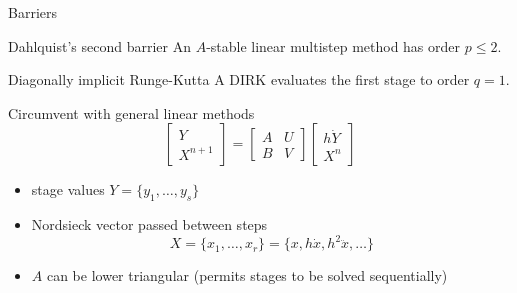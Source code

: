 \begin{frame}{Barriers}
  \begin{block}{Dahlquist's second barrier}
    An $A$-stable linear multistep method has order $p \le 2$.
  \end{block}
  \begin{block}{Diagonally implicit Runge-Kutta}
    A DIRK evaluates the first stage to order $q = 1$.
  \end{block}
  \begin{block}{Circumvent with general linear methods}
    \begin{equation*}
      \begin{bmatrix} Y \\ X^{n+1} \end{bmatrix}
      =
      \begin{bmatrix} A & U \\ B & V \end{bmatrix}
      \begin{bmatrix} h \dot{Y} \\ X^{n} \end{bmatrix}
    \end{equation*}
    \begin{itemize}
    \item stage values $Y = \{ y_1,\dotsc,y_s \}$
    \item Nordsieck vector passed between steps
      \[ X = \{x_1,\dotsc,x_r\} = \{x, h \dot{x}, h^2 \ddot{x}, \dotsc \} \]
    \item $A$ can be lower triangular (permits stages to be solved sequentially)
    \end{itemize}
  \end{block}
\end{frame}
